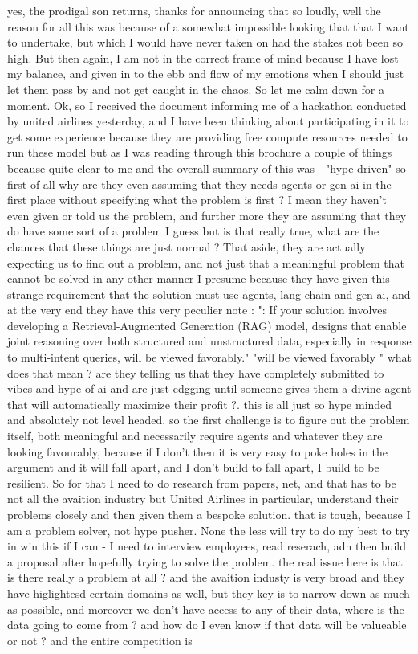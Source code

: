 \begin{userprompt}
yes, the prodigal son returns, thanks for announcing that so loudly,
well the reason for all this was because of a somewhat impossible looking that that I want to undertake, but which I would have never taken on had the stakes not been so high. But then again, I am not in the correct frame of mind because I have lost my balance, and given in to the ebb and flow of my emotions when I should just let them pass by and not get caught in the chaos. So let me calm down for a moment. Ok, so I received the document informing me of a hackathon conducted by united airlines yesterday, and I have been thinking about participating in it to get some experience because they are providing free compute resources needed to run these model but as I was reading through this brochure a couple of things because quite clear to me and the overall summary of this was - "hype driven" so first of all why are they even assuming that they needs agents or gen ai in the first place without specifying what the problem is first ? I mean they haven't even given or told us the problem, and further more they are assuming that they do have some sort of a problem I guess but is that really true, what are the chances that these things are just normal ? That aside, they are actually expecting us to find out a problem, and not just that a meaningful problem that cannot be solved in any other manner I presume because they have given this strange requirement that the solution must use agents, lang chain and gen ai, and at the very end they have this very peculier note : ": If your solution involves developing a Retrieval-Augmented Generation (RAG) model, designs that enable joint reasoning over both structured and unstructured data, especially in response to multi-intent queries, will be viewed favorably." "will be viewed favorably " what does that mean ? are they telling us that they have completely submitted to vibes and hype of ai and are just edgging until someone gives them a divine agent that will automatically maximize their profit ?. this is all just so hype minded and absolutely not level headed. so the first challenge is to figure out the problem itself, both meaningful and necessarily require agents and whatever they are looking favourably, because if I don't then it is very easy to poke holes in the argument and it will fall apart, and I don't build to fall apart, I build to be resilient. So for that I need to do research from papers, net, and that has to be not all the avaition industry but United Airlines in particular, understand their problems closely and then given them a bespoke solution. that is tough, because I am a problem solver, not hype pusher. None the less will try to do my best to try in win this if I can - I need to interview employees, read reserach, adn then build a proposal after hopefully trying to solve the problem. the real issue here is that is there really a problem at all ? and the avaition industy is very broad and they have higlightesd certain domains as well, but they key is to narrow down as much as possible, and moreover we don't have access to any of their data, where is the data going to come from ? and how do I even know if that data will be valueable or not ? and the entire competition is 
\end{userprompt}
